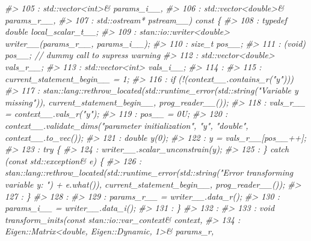 \documentclass[
  10pt,
  italian,
  a4paper,
  extrafontsizes,onecolumn,openright
  ]{memoir}
\newenvironment{Shaded}{\begin{snugshade}}{\end{snugshade}}
\newcommand{\CommentTok}[1]{\textcolor[rgb]{0.56,0.35,0.01}{\textit{#1}}}
\begin{document}
\begin{Shaded}
\begin{Highlighting}[]
\CommentTok{\#\textgreater{}  105 :                          std::vector\textless{}int\textgreater{}\& params\_i\_\_,}
\CommentTok{\#\textgreater{}  106 :                          std::vector\textless{}double\textgreater{}\& params\_r\_\_,}
\CommentTok{\#\textgreater{}  107 :                          std::ostream* pstream\_\_) const \{}
\CommentTok{\#\textgreater{}  108 :         typedef double local\_scalar\_t\_\_;}
\CommentTok{\#\textgreater{}  109 :         stan::io::writer\textless{}double\textgreater{} writer\_\_(params\_r\_\_, params\_i\_\_);}
\CommentTok{\#\textgreater{}  110 :         size\_t pos\_\_;}
\CommentTok{\#\textgreater{}  111 :         (void) pos\_\_; // dummy call to supress warning}
\CommentTok{\#\textgreater{}  112 :         std::vector\textless{}double\textgreater{} vals\_r\_\_;}
\CommentTok{\#\textgreater{}  113 :         std::vector\textless{}int\textgreater{} vals\_i\_\_;}
\CommentTok{\#\textgreater{}  114 : }
\CommentTok{\#\textgreater{}  115 :         current\_statement\_begin\_\_ = 1;}
\CommentTok{\#\textgreater{}  116 :         if (!(context\_\_.contains\_r("y")))}
\CommentTok{\#\textgreater{}  117 :             stan::lang::rethrow\_located(std::runtime\_error(std::string("Variable y missing")), current\_statement\_begin\_\_, prog\_reader\_\_());}
\CommentTok{\#\textgreater{}  118 :         vals\_r\_\_ = context\_\_.vals\_r("y");}
\CommentTok{\#\textgreater{}  119 :         pos\_\_ = 0U;}
\CommentTok{\#\textgreater{}  120 :         context\_\_.validate\_dims("parameter initialization", "y", "double", context\_\_.to\_vec());}
\CommentTok{\#\textgreater{}  121 :         double y(0);}
\CommentTok{\#\textgreater{}  122 :         y = vals\_r\_\_[pos\_\_++];}
\CommentTok{\#\textgreater{}  123 :         try \{}
\CommentTok{\#\textgreater{}  124 :             writer\_\_.scalar\_unconstrain(y);}
\CommentTok{\#\textgreater{}  125 :         \} catch (const std::exception\& e) \{}
\CommentTok{\#\textgreater{}  126 :             stan::lang::rethrow\_located(std::runtime\_error(std::string("Error transforming variable y: ") + e.what()), current\_statement\_begin\_\_, prog\_reader\_\_());}
\CommentTok{\#\textgreater{}  127 :         \}}
\CommentTok{\#\textgreater{}  128 : }
\CommentTok{\#\textgreater{}  129 :         params\_r\_\_ = writer\_\_.data\_r();}
\CommentTok{\#\textgreater{}  130 :         params\_i\_\_ = writer\_\_.data\_i();}
\CommentTok{\#\textgreater{}  131 :     \}}
\CommentTok{\#\textgreater{}  132 : }
\CommentTok{\#\textgreater{}  133 :     void transform\_inits(const stan::io::var\_context\& context,}
\CommentTok{\#\textgreater{}  134 :                          Eigen::Matrix\textless{}double, Eigen::Dynamic, 1\textgreater{}\& params\_r,}

\end{Highlighting}
\end{Shaded}
\end{document}
